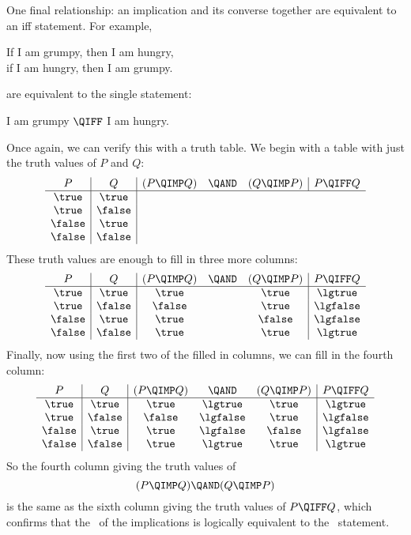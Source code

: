 One final relationship: an implication and its converse together are
equivalent to an iff statement.  For example,
%
\begin{center}
If I am grumpy, then I am hungry, \QAND \\
if I am hungry, then I am grumpy.
\end{center}
%
are equivalent to the single statement:
%
\begin{center}
I am grumpy $\QIFF$ I am hungry.
\end{center}
%
Once again, we can verify this with a truth table.  We begin with a table
with just the truth values of $P$ and $Q$:
%
\[
\begin{array}{c|c|ccc|c}
P & Q & (P \QIMP Q) &\QAND & (Q  \QIMP  P) & P \QIFF Q \\
\hline
\true  &  \true\\
\true  &  \false\\
\false &  \true\\
\false &  \false
\end{array}
\]
These truth values are enough to fill in three more columns:
\[
\begin{array}{c|c|ccc|c}
P & Q & (P \QIMP Q) &\QAND & (Q  \QIMP  P) & P \QIFF Q \\
\hline
\true  &  \true  &\true  &&\true & \lgtrue \\
\true  &  \false &\false &&\true & \lgfalse\\
\false &  \true  &\true  &&\false& \lgfalse\\
\false &  \false &\true  &&\true & \lgtrue 
\end{array}
\]
Finally, now using the first two of the filled in columns, we can fill in
the fourth column:
\[
\begin{array}{c|c|ccc|c}
P & Q & (P \QIMP Q) &\QAND & (Q  \QIMP  P) & P \QIFF Q \\
\hline
\true  &  \true  &\true  &\lgtrue &\true & \lgtrue \\
\true  &  \false &\false &\lgfalse&\true & \lgfalse\\
\false &  \true  &\true  &\lgfalse&\false& \lgfalse\\
\false &  \false &\true  &\lgtrue &\true & \lgtrue
\end{array}
\]
So the fourth column giving the truth values of 
\[
(P \QIMP Q) \QAND (Q \QIMP P)
\]
is the same as the sixth column giving the truth values of $P \QIFF
Q$, which confirms that the \QAND\ of the implications is logically
equivalent to the \QIFF\ statement.

